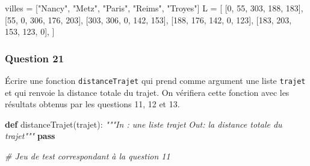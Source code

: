 \documentclass[
  paper=a4,
  ,captions=tableheading
]{scrartcl}
\newenvironment{Shaded}{}{}
\newcommand{\CommentTok}[1]{\textcolor[rgb]{0.38,0.63,0.69}{\textit{#1}}}
\newcommand{\ControlFlowTok}[1]{\textcolor[rgb]{0.00,0.44,0.13}{\textbf{#1}}}
\newcommand{\DecValTok}[1]{\textcolor[rgb]{0.25,0.63,0.44}{#1}}
\newcommand{\KeywordTok}[1]{\textcolor[rgb]{0.00,0.44,0.13}{\textbf{#1}}}
\newcommand{\NormalTok}[1]{#1}
\newcommand{\OperatorTok}[1]{\textcolor[rgb]{0.40,0.40,0.40}{#1}}
\newcommand{\StringTok}[1]{\textcolor[rgb]{0.25,0.44,0.63}{#1}}
\begin{document}
\begin{Shaded}
\begin{Highlighting}[]
\NormalTok{villes }\OperatorTok{=}\NormalTok{ [}\StringTok{"Nancy"}\NormalTok{, }\StringTok{"Metz"}\NormalTok{, }\StringTok{"Paris"}\NormalTok{, }\StringTok{"Reims"}\NormalTok{, }\StringTok{"Troyes"}\NormalTok{]}
\NormalTok{L }\OperatorTok{=}\NormalTok{ [}
\NormalTok{    [}\DecValTok{0}\NormalTok{, }\DecValTok{55}\NormalTok{, }\DecValTok{303}\NormalTok{, }\DecValTok{188}\NormalTok{, }\DecValTok{183}\NormalTok{],}
\NormalTok{    [}\DecValTok{55}\NormalTok{, }\DecValTok{0}\NormalTok{, }\DecValTok{306}\NormalTok{, }\DecValTok{176}\NormalTok{, }\DecValTok{203}\NormalTok{],}
\NormalTok{    [}\DecValTok{303}\NormalTok{, }\DecValTok{306}\NormalTok{, }\DecValTok{0}\NormalTok{, }\DecValTok{142}\NormalTok{, }\DecValTok{153}\NormalTok{],}
\NormalTok{    [}\DecValTok{188}\NormalTok{, }\DecValTok{176}\NormalTok{, }\DecValTok{142}\NormalTok{, }\DecValTok{0}\NormalTok{, }\DecValTok{123}\NormalTok{],}
\NormalTok{    [}\DecValTok{183}\NormalTok{, }\DecValTok{203}\NormalTok{, }\DecValTok{153}\NormalTok{, }\DecValTok{123}\NormalTok{, }\DecValTok{0}\NormalTok{],}
\NormalTok{]}
\end{Highlighting}
\end{Shaded}

\hypertarget{question-21}{%
\subsubsection{Question 21}\label{question-21}}

Écrire une fonction \texttt{distanceTrajet} qui prend comme argument une
liste \texttt{trajet} et qui renvoie la distance totale du trajet. On
vérifiera cette fonction avec les résultats obtenus par les questions
11, 12 et 13.

\begin{Shaded}
\begin{Highlighting}[]
\KeywordTok{def}\NormalTok{ distanceTrajet(trajet):}
    \CommentTok{"""In : une liste trajet}
\CommentTok{    Out: la distance totale du trajet"""}
    \ControlFlowTok{pass}
\end{Highlighting}
\end{Shaded}

\begin{Shaded}
\begin{Highlighting}[]
\CommentTok{\# Jeu de test correspondant à la question 11}
\end{Highlighting}
\end{Shaded}
\end{document}
